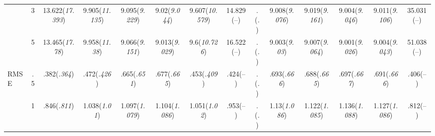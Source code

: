 \documentclass{article}
\begin{document}
\begin{table}[tbp]
{\begin{tabularx}{\textwidth}{lCCCCCCCCCCCCC}
&3&13.622\newline (\emph{17.393})&9.905\newline (\emph{11.135})&9.095\newline (\emph{9.229})&9.02\newline (\emph{9.044})&9.607\newline (\emph{10.579})&14.829\newline (--)&.\newline (\emph{.})&9.008\newline (\emph{9.076})&9.019\newline (\emph{9.161})&9.004\newline (\emph{9.046})&9.011\newline (\emph{9.106})&35.031\newline (--) \tabularnewline
&5&13.465\newline (\emph{17.78})&9.958\newline (\emph{11.38})&9.066\newline (\emph{9.151})&9.013\newline (\emph{9.029})&9.6\newline (\emph{10.726})&16.522\newline (--)&.\newline (\emph{.})&9.003\newline (\emph{9.03})&9.007\newline (\emph{9.064})&9.001\newline (\emph{9.026})&9.004\newline (\emph{9.043})&51.038\newline (--) \tabularnewline
\midrule RMSE&.5&.382\newline (\emph{.364})&.472\newline (\emph{.426})&.665\newline (\emph{.651})&.677\newline (\emph{.665})&.453\newline (\emph{.409})&.424\newline (--)&.\newline (\emph{.})&.693\newline (\emph{.666})&.688\newline (\emph{.665})&.697\newline (\emph{.667})&.691\newline (\emph{.666})&.406\newline (--) \tabularnewline
&1&.846\newline (\emph{.811})&1.038\newline (\emph{1.01})&1.097\newline (\emph{1.079})&1.104\newline (\emph{1.086})&1.051\newline (\emph{1.02})&.953\newline (--)&.\newline (\emph{.})&1.13\newline (\emph{1.086})&1.122\newline (\emph{1.085})&1.136\newline (\emph{1.088})&1.127\newline (\emph{1.086})&.812\newline (--) \tabularnewline

\end{tabularx}}
\end{table}
\end{document}
